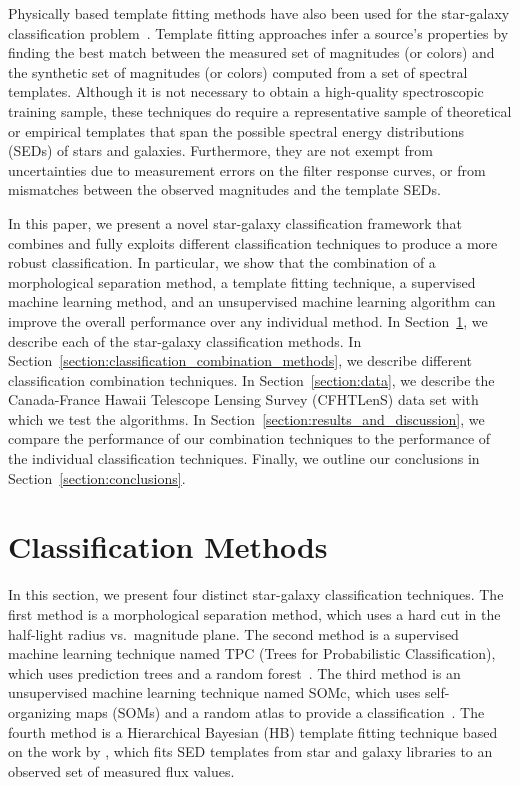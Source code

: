 \documentclass[useAMS,usenatbib]{mn2e}
\begin{document}
Physically based template fitting methods
have also been used for the star-galaxy classification
problem~\citep{robin2007stellar, Fadely2012}.
Template fitting approaches infer a source's properties
by finding the best match between
the measured set of magnitudes (or colors)
and the synthetic set of magnitudes (or colors)
computed from a set of spectral templates.
Although it is not necessary to obtain
a high-quality spectroscopic training sample,
these techniques do require
a representative sample of theoretical or empirical templates
that span the possible spectral energy distributions (SEDs)
of stars and galaxies.
Furthermore, they are not exempt from uncertainties
due to measurement errors on the filter response curves,
or from mismatches between the observed magnitudes
and the template SEDs.

In this paper,
we present a novel star-galaxy classification framework
that combines and fully exploits different classification techniques
to produce a more robust classification.
In particular,
we show that the combination of a morphological separation method,
a template fitting technique, a supervised machine learning method,
and an unsupervised machine learning algorithm
can improve the overall performance over any individual method.
In Section~\ref{section:classification_methods},
we describe each of the star-galaxy classification methods.
In Section~\ref{section:classification_combination_methods},
we describe different classification combination techniques.
In Section~\ref{section:data},
we describe the Canada-France Hawaii Telescope Lensing Survey (CFHTLenS)
data set with which we test the algorithms.
In Section~\ref{section:results_and_discussion},
we compare the performance of our combination techniques
to the performance of the individual classification techniques.
Finally, we outline our conclusions in Section~\ref{section:conclusions}.

\section{Classification Methods}
  \label{section:classification_methods}

In this section, we present
four distinct star-galaxy classification techniques.
The first method is a morphological separation method,
which uses a hard cut in the half-light radius vs.\ magnitude plane.
The second method is
a supervised machine learning technique named TPC
(Trees for Probabilistic Classification),
which uses prediction trees and a random forest~\citep{carrascokind2013tpz}.
The third method is
an unsupervised machine learning technique named SOMc,
which uses self-organizing maps (SOMs) and a random atlas
to provide a classification~\citep{carrascokind2014somz}.
The fourth method is
a Hierarchical Bayesian (HB) template fitting technique
based on the work by \citet{Fadely2012},
which fits SED templates from star and galaxy libraries
to an observed set of measured flux values.
\end{document}
